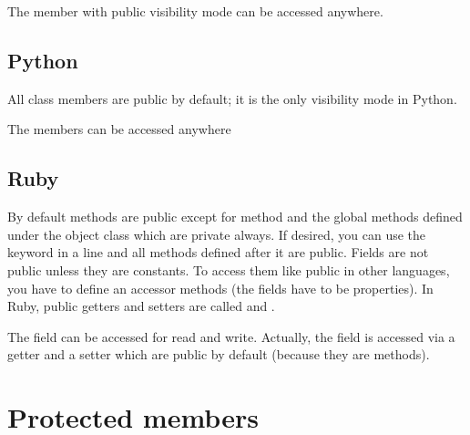 \documentclass{KodeBook}
\begin{document}


The member with public visibility mode can be accessed anywhere.



\subsection{Python}

All class members are public by default; it is the only visibility mode in Python. 



The members can be accessed anywhere


\subsection{Ruby}

By default methods are public except for  method and the global methods defined under the object class which are private always. 
If desired, you can use the keyword  in a line and all methods defined after it are public. 
Fields are not public unless they are constants. 
To access them like public in other languages, you have to define an accessor methods (the fields have to be properties).
In Ruby, public getters and setters are called  and .



The field can be accessed for read and write. 
Actually, the field is accessed via a getter and a setter which are public by default (because they are methods).




\section{Protected members}
\end{document}
